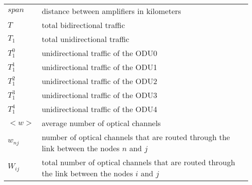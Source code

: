 \begin{table}[!ht]
\begin{tabular}{l p{}}
$span$ & distance between amplifiers in kilometers\\ [3mm]

$T$ & total bidirectional traffic \\
$T_1$ & total unidirectional traffic \\
$T_1^0$ & unidirectional traffic of the ODU0 \\
$T_1^1$ & unidirectional traffic of the ODU1 \\
$T_1^2$ & unidirectional traffic of the ODU2 \\
$T_1^3$ & unidirectional traffic of the ODU3 \\
$T_1^4$ & unidirectional traffic of the ODU4 \\ [3mm]

$<w>$ & average number of optical channels\\
$w_{nj}$ & number of optical channels that are routed through the link between the nodes $n$ and $j$ \\
$W_{ij}$ & total number of optical channels that are routed through the link between the nodes $i$ and $j$\\
			
	\end{tabular}	
\end{table}


\begin{table}[!ht]
\renewcommand{\arraystretch}{1.3}
	\flushright	
	\begin{tabular}{l p{}}

  	\end{tabular}	
\end{table}
